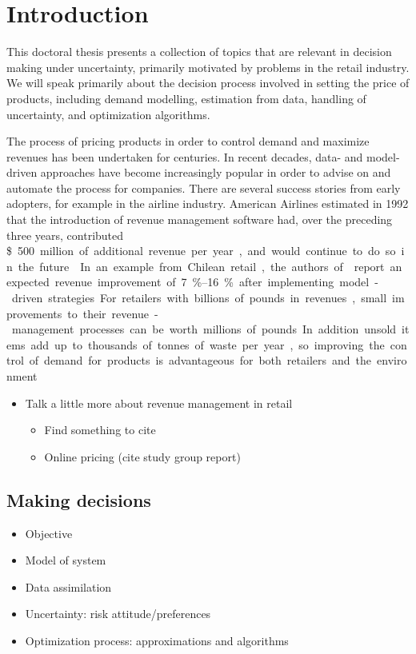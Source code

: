 \documentclass[main.tex]{subfiles}
\begin{document}
\chapter{Introduction}
This doctoral thesis presents a collection of topics that are relevant
in decision making under uncertainty, primarily motivated by
problems in the retail industry.
We will speak primarily about the decision process involved in setting the
price of products, including demand modelling, estimation from data,
handling of uncertainty, and optimization algorithms.

The process of pricing products in order to control demand and
maximize revenues has been undertaken for centuries. In recent
decades, data- and model-driven approaches have become increasingly
popular in order to advise on and automate the process for companies.
There are several success stories from early adopters, for example in
the airline industry.
American Airlines estimated in 1992 that the introduction of revenue
management software had, over the preceding three
years, contributed \SI{500}[\$] million of additional revenue per year,
and would continue to do so in the future~\cite{smith1992yield}.
In an example from Chilean retail, the authors of~\cite{bitran1998coordinating}
report an expected revenue improvement of \SIrange{7}{16}{\percent} after implementing
model-driven strategies.
For retailers with billions of pounds in revenues, small
improvements to their revenue-management processes can be worth millions
of pounds.
In addition unsold items add up to thousands of tonnes of waste per year, so
improving the control of demand for products is advantageous
for both retailers and the environment.


\begin{itemize}
\item Talk a little more about revenue management in retail
\begin{itemize}
\item Find something to cite
\item Online pricing (cite  study group report)
\end{itemize}
\end{itemize}

\section{Making decisions}

\begin{itemize}
\item Objective
\item Model of system
\item Data assimilation
\item Uncertainty: risk attitude/preferences
\item Optimization process: approximations and algorithms
\end{itemize}
\end{document}
